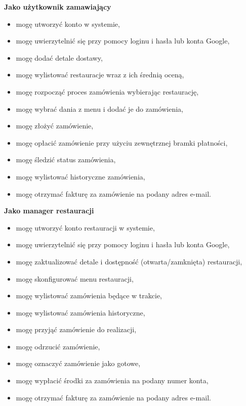 \medskip

\textbf{Jako użytkownik zamawiający}
\begin{itemize}
    \item mogę utworzyć konto w systemie,
    \item mogę uwierzytelnić się przy pomocy loginu i hasła lub konta Google,
    \item mogę dodać detale dostawy,
    \item mogę wylistować restauracje wraz z ich średnią oceną,
    \item mogę rozpocząć proces zamówienia wybierając restaurację,
    \item mogę wybrać dania z menu i dodać je do zamówienia,
    \item mogę złożyć zamówienie,
    \item mogę opłacić zamówienie przy użyciu zewnętrznej bramki płatności,
    \item mogę śledzić status zamówienia,
    \item mogę wylistować historyczne zamówienia,
    \item mogę otrzymać fakturę za zamówienie na podany adres e-mail.
\end{itemize}

\medskip

\textbf{Jako manager restauracji}
\begin{itemize}
    \item mogę utworzyć konto restauracji w systemie,
    \item mogę uwierzytelnić się przy pomocy loginu i hasła lub konta Google,
    \item mogę zaktualizować detale i dostępność (otwarta/zamknięta) restauracji,
    \item mogę skonfigurować menu restauracji,
    \item mogę wylistować zamówienia będące w trakcie,
    \item mogę wylistować zamówienia historyczne,
    \item mogę przyjąć zamówienie do realizacji,
    \item mogę odrzucić zamówienie,
    \item mogę oznaczyć zamówienie jako gotowe,
    \item mogę wypłacić środki za zamówienia na podany numer konta,
    \item mogę otrzymać fakturę za zamówienie na podany adres e-mail.
\end{itemize}

